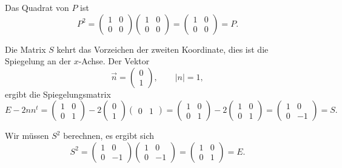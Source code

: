 \begin{loesung}
\begin{teilaufgaben}
\item 
Das Quadrat von $P$ ist
\[
P^2=
\begin{pmatrix}1&0\\0&0\end{pmatrix}
\begin{pmatrix}1&0\\0&0\end{pmatrix}
=
\begin{pmatrix}1&0\\0&0\end{pmatrix}
=
P.
\]
\item
Die Matrix $S$ kehrt das Vorzeichen der zweiten Koordinate, dies ist
die Spiegelung an der $x$-Achse. 
Der Vektor
\[
\vec{n}
=
\begin{pmatrix}0\\1\end{pmatrix},
\qquad
|n| = 1,
\]
ergibt die Spiegelungsmatrix
\[
E-2nn^t
=
\begin{pmatrix}1&0\\0&1\end{pmatrix}
-2\begin{pmatrix}0\\1\end{pmatrix}\begin{pmatrix}0&1\end{pmatrix}
=
\begin{pmatrix}1&0\\0&1\end{pmatrix}
-2
\begin{pmatrix}1&0\\0&1\end{pmatrix}
=
\begin{pmatrix}1&0\\0&-1\end{pmatrix}
=
S.
\]
\item
Wir müssen $S^2$ berechnen, es ergibt sich
\[
S^2
=
\begin{pmatrix}1&0\\0&-1\end{pmatrix}
\begin{pmatrix}1&0\\0&-1\end{pmatrix}
=
\begin{pmatrix}1&0\\0&1\end{pmatrix}
=
E.
\]
\item 

\end{teilaufgaben}
\end{loesung}
